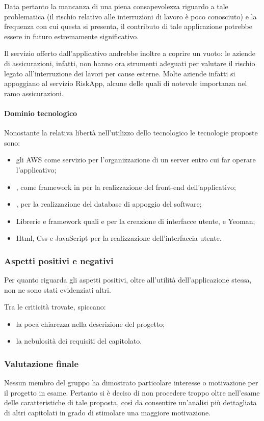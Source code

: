 			Data pertanto la mancanza di una piena consapevolezza riguardo a tale problematica (il rischio relativo alle interruzioni di lavoro è poco conosciuto) e la frequenza con cui questa si presenta, il contributo di tale applicazione potrebbe essere in futuro estremamente significativo.

			Il servizio offerto dall'applicativo andrebbe inoltre a coprire un vuoto: le aziende di assicurazioni, infatti, non hanno ora strumenti adeguati per valutare il rischio legato all'interruzione dei lavori per cause esterne. Molte aziende infatti si appoggiano al servizio RiskApp, alcune delle quali di notevole importanza nel ramo assicurazioni.
			\paragraph{Dominio tecnologico}
			Nonostante la relativa libertà nell'utilizzo dello  tecnologico le tecnologie proposte sono:
			\begin{itemize}
				\item gli AWS come servizio per l'organizzazione di un server entro cui far operare l'applicativo;
				\item {}, come framework in  per la realizzazione del front-end dell'applicativo;
				\item {}, per la realizzazione del database di appoggio del software;
				\item Librerie e framework quali  e  per la creazione di interfacce utente,  e Yeoman;
				\item Html, Css e JavaScript per la realizzazione dell'interfaccia utente.
			\end{itemize}
		\subsubsection{Aspetti positivi e negativi}
		Per quanto riguarda gli aspetti positivi, oltre all'utilità dell'applicazione stessa, non ne sono stati evidenziati altri.
		
		Tra le criticità trovate, spiccano:
		\begin{itemize}
			\item la poca chiarezza nella descrizione del progetto;
			\item la nebulosità dei requisiti del capitolato.
		\end{itemize}
		\subsubsection{Valutazione finale}
		Nessun membro del gruppo ha dimostrato particolare interesse o motivazione per il progetto in esame. Pertanto si è deciso di non procedere 
		troppo oltre nell'esame delle caratteristiche di tale proposta, così da consentire un'analisi più dettagliata di altri capitolati in grado 
		di stimolare una maggiore motivazione.
		
